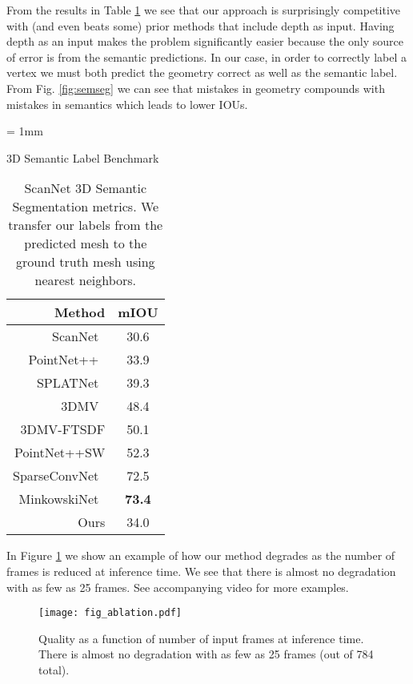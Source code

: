 \documentclass[runningheads]{llncs}
\begin{document}
From the results in Table \ref{tab:scannet} we see that our approach is surprisingly competitive with (and even beats some) prior methods that include depth as input. Having depth as an input makes the problem significantly easier because the only source of error is from the semantic predictions. In our case, in order to correctly label a vertex we must both predict the geometry correct as well as the semantic label. From Fig. \ref{fig:semseg} we can see that mistakes in geometry compounds with mistakes in semantics which leads to lower IOUs.










 \tabcolsep= 1mm
 \begin{table}[t]
     \centering
     \caption{3D Semantic Label Benchmark}
\begin{tabular}{rc}
     \hline
             \small{Method}  & \small{mIOU} \\
    \hline
        ScanNet~\cite{dai2017scannet}  & 30.6\\
        PointNet++~\cite{qi2017pointnet} & 33.9\\
        SPLATNet~\cite{su2018splatnet} & 39.3 \\
        3DMV~\cite{dai20183dmv} & 48.4 \\
        3DMV-FTSDF & 50.1 \\
        PointNet++SW & 52.3 \\
        SparseConvNet~\cite{graham20183d} & 72.5 \\
        MinkowskiNet~\cite{choy20194d} & \textbf{73.4} \\
    \hline
        Ours & 34.0 \\
    \hline
    \end{tabular}
\label{tab:scannet}
    \caption*{\small{ScanNet 3D Semantic Segmentation metrics. We transfer our labels from the predicted mesh to the ground truth mesh using nearest neighbors.}}
\end{table}


In Figure \ref{fig:ablation} we show an example of how our method degrades as the number of frames is reduced at inference time. We see that there is almost no degradation with as few as 25 frames. See accompanying video for more examples.

\begin{figure}
\centering
\texttt{[image: fig\_ablation.pdf]}
\caption{Quality as a function of number of input frames at inference time.
There is almost no degradation with as few as 25 frames (out of 784 total).
}
\label{fig:ablation}
\end{figure}
\end{document}
